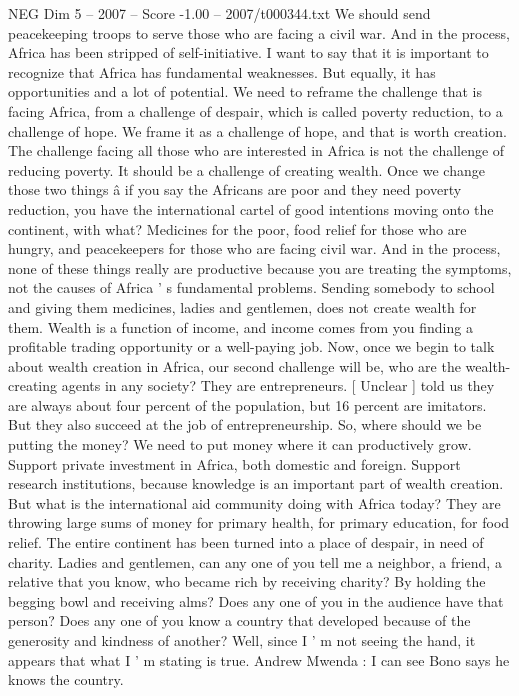\begin{textsample}{NEG Dim 5 – 2007 – Score -1.00 – 2007/t000344.txt}
We should send peacekeeping troops to serve those who are facing a civil war.
And in the process, Africa has been stripped of self-initiative.
I want to say that it is important to recognize that Africa has fundamental weaknesses.
But equally, it has opportunities and a lot of potential.
We need to reframe the challenge that is facing Africa, from a challenge of despair, which is called poverty reduction, to a challenge of hope.
We frame it as a challenge of hope, and that is worth creation.
The challenge facing all those who are interested in Africa is not the challenge of reducing poverty.
It should be a challenge of creating wealth.
Once we change those two things â if you say the Africans are poor and they need poverty reduction, you have the international cartel of good intentions moving onto the continent, with what?
Medicines for the poor, food relief for those who are hungry, and peacekeepers for those who are facing civil war.
And in the process, none of these things really are productive because you are treating the symptoms, not the causes of Africa ' s fundamental problems.
Sending somebody to school and giving them medicines, ladies and gentlemen, does not create wealth for them.
Wealth is a function of income, and income comes from you finding a profitable trading opportunity or a well-paying job.
Now, once we begin to talk about wealth creation in Africa, our second challenge will be, who are the wealth-creating agents in any society?
They are entrepreneurs. [ Unclear ] told us they are always about four percent of the population, but 16 percent are imitators.
But they also succeed at the job of entrepreneurship.
So, where should we be putting the money?
We need to put money where it can productively grow.
Support private investment in Africa, both domestic and foreign.
Support research institutions, because knowledge is an important part of wealth creation.
But what is the international aid community doing with Africa today?
They are throwing large sums of money for primary health, for primary education, for food relief.
The entire continent has been turned into a place of despair, in need of charity.
Ladies and gentlemen, can any one of you tell me a neighbor, a friend, a relative that you know, who became rich by receiving charity?
By holding the begging bowl and receiving alms?
Does any one of you in the audience have that person?
Does any one of you know a country that developed because of the generosity and kindness of another?
Well, since I ' m not seeing the hand, it appears that what I ' m stating is true.
Andrew Mwenda : I can see Bono says he knows the country.

\end{textsample}
